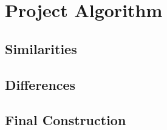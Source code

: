 \chapter{Project Algorithm}

\section{Similarities}

\section{Differences}

\section{Final Construction}